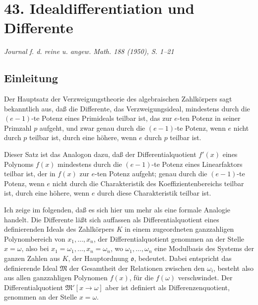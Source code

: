 \documentclass[11pt]{article}
\begin{document}
\clearpage

\section*{43. Idealdifferentiation und Differente}

\begin{center}
\emph{Journal f. d. reine u. angew. Math. 188 (1950), S. 1--21}
\end{center}

\subsection*{Einleitung}

Der Hauptsatz der Verzweigungstheorie des algebraischen Zahlkörpers sagt bekanntlich aus, daß die Differente, das Verzweigungsideal, mindestens durch die $(e-1)$-te Potenz eines Primideals teilbar ist, das zur $e$-ten Potenz in seiner Primzahl $p$ aufgeht, und zwar genau durch die $(e-1)$-te Potenz, wenn $e$ nicht durch $p$ teilbar ist, durch eine höhere, wenn $e$ durch $p$ teilbar ist.

Dieser Satz ist das Analogon dazu, daß der Differentialquotient $f'(x)$ eines Polynoms $f(x)$ mindestens durch die $(e-1)$-te Potenz eines Linearfaktors teilbar ist, der in $f(x)$ zur $e$-ten Potenz aufgeht; genau durch die $(e-1)$-te Potenz, wenn $e$ nicht durch die Charakteristik des Koeffizientenbereichs teilbar ist, durch eine höhere, wenn $e$ durch diese Charakteristik teilbar ist.

Ich zeige im folgenden, daß es sich hier um mehr als eine formale Analogie handelt. Die Differente läßt sich auffassen als Differentialquotient eines definierenden Ideals des Zahlkörpers $K$ in einem zugeordneten ganzzahligen Polynombereich von $x_1,\ldots,x_n$, der Differentialquotient genommen an der Stelle $x=\omega$, also bei $x_1=\omega_1,\ldots,x_n=\omega_n$, wo $\omega_1,\ldots,\omega_n$ eine Modulbasis des Systems der ganzen Zahlen aus $K$, der Hauptordnung $\mathfrak o$, bedeutet. Dabei entspricht das definierende Ideal $\mathfrak M$ der Gesamtheit der Relationen zwischen den $\omega_i$, besteht also aus allen ganzzahligen Polynomen $f(x)$, für die $f(\omega)$ verschwindet. Der Differentialquotient $\mathfrak M'[x\to\omega]$ aber ist definiert als Differenzenquotient, genommen an der Stelle $x=\omega$.
\end{document}

